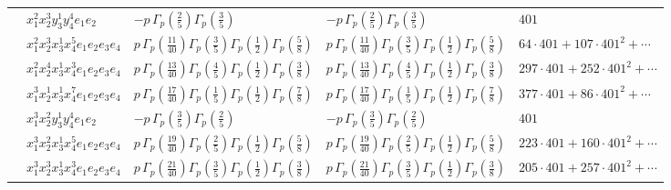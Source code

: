 \documentclass[11pt]{article}
\begin{document}
\begin{table}[ht]
{\begin{tabular}{@{}lllll@{}}
 & $x_{1}^{2} x_{2}^{3} y_{3}^{1} y_{4}^{4} e_{1} e_{2}$ & $- p \, \Gamma_p \left( \frac{2}{5} \right) \Gamma_p \left( \frac{3}{5} \right)$ & $- p \, \Gamma_p \left( \frac{2}{5} \right) \Gamma_p \left( \frac{3}{5} \right)$ & $401$ \\
 & $x_{1}^{2} x_{2}^{3} x_{3}^{1} x_{4}^{5}  e_{1} e_{2} e_{3} e_{4}$ & $p \, \Gamma_p \left( \frac{11}{40} \right) \Gamma_p \left( \frac{3}{5} \right) \Gamma_p \left( \frac{1}{2} \right) \Gamma_p \left( \frac{5}{8} \right)$ & $p \, \Gamma_p \left( \frac{11}{40} \right) \Gamma_p \left( \frac{3}{5} \right) \Gamma_p \left( \frac{1}{2} \right) \Gamma_p \left( \frac{5}{8} \right)$ & $64{\cdot}401{+}107{\cdot}401^{2}{+}\cdots$ \\
 & $x_{1}^{2} x_{2}^{4} x_{3}^{1} x_{4}^{3}  e_{1} e_{2} e_{3} e_{4}$ & $p \, \Gamma_p \left( \frac{13}{40} \right) \Gamma_p \left( \frac{4}{5} \right) \Gamma_p \left( \frac{1}{2} \right) \Gamma_p \left( \frac{3}{8} \right)$ & $p \, \Gamma_p \left( \frac{13}{40} \right) \Gamma_p \left( \frac{4}{5} \right) \Gamma_p \left( \frac{1}{2} \right) \Gamma_p \left( \frac{3}{8} \right)$ & $297{\cdot}401{+}252{\cdot}401^{2}{+}\cdots$ \\
 & $x_{1}^{3} x_{2}^{1} x_{3}^{1} x_{4}^{7}  e_{1} e_{2} e_{3} e_{4}$ & $p \, \Gamma_p \left( \frac{17}{40} \right) \Gamma_p \left( \frac{1}{5} \right) \Gamma_p \left( \frac{1}{2} \right) \Gamma_p \left( \frac{7}{8} \right)$ & $p \, \Gamma_p \left( \frac{17}{40} \right) \Gamma_p \left( \frac{1}{5} \right) \Gamma_p \left( \frac{1}{2} \right) \Gamma_p \left( \frac{7}{8} \right)$ & $377{\cdot}401{+}86{\cdot}401^{2}{+}\cdots$ \\
 & $x_{1}^{3} x_{2}^{2} y_{3}^{1} y_{4}^{4} e_{1} e_{2}$ & $- p \, \Gamma_p \left( \frac{3}{5} \right) \Gamma_p \left( \frac{2}{5} \right)$ & $- p \, \Gamma_p \left( \frac{3}{5} \right) \Gamma_p \left( \frac{2}{5} \right)$ & $401$ \\
 & $x_{1}^{3} x_{2}^{2} x_{3}^{1} x_{4}^{5}  e_{1} e_{2} e_{3} e_{4}$ & $p \, \Gamma_p \left( \frac{19}{40} \right) \Gamma_p \left( \frac{2}{5} \right) \Gamma_p \left( \frac{1}{2} \right) \Gamma_p \left( \frac{5}{8} \right)$ & $p \, \Gamma_p \left( \frac{19}{40} \right) \Gamma_p \left( \frac{2}{5} \right) \Gamma_p \left( \frac{1}{2} \right) \Gamma_p \left( \frac{5}{8} \right)$ & $223{\cdot}401{+}160{\cdot}401^{2}{+}\cdots$ \\
 & $x_{1}^{3} x_{2}^{3} x_{3}^{1} x_{4}^{3}  e_{1} e_{2} e_{3} e_{4}$ & $p \, \Gamma_p \left( \frac{21}{40} \right) \Gamma_p \left( \frac{3}{5} \right) \Gamma_p \left( \frac{1}{2} \right) \Gamma_p \left( \frac{3}{8} \right)$ & $p \, \Gamma_p \left( \frac{21}{40} \right) \Gamma_p \left( \frac{3}{5} \right) \Gamma_p \left( \frac{1}{2} \right) \Gamma_p \left( \frac{3}{8} \right)$ & $205{\cdot}401{+}257{\cdot}401^{2}{+}\cdots$ \\

\end{tabular}}
\end{table}
\end{document}
